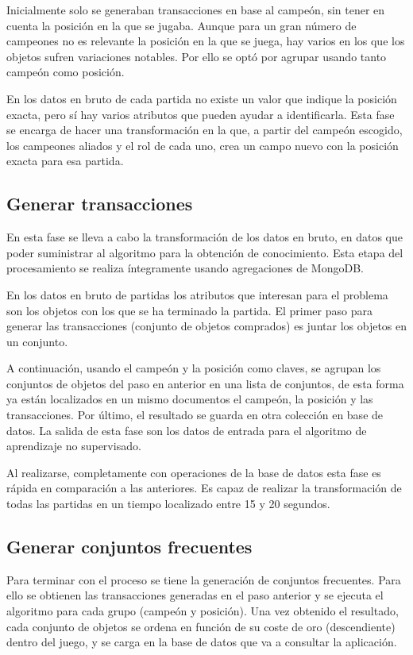 Inicialmente solo se generaban transacciones en base al campeón, sin tener en cuenta la posición en la que se jugaba. Aunque para un gran número de campeones no es relevante la posición en la que se juega, hay varios en los que los objetos sufren variaciones notables. Por ello se optó por agrupar usando tanto campeón como posición.

En los datos en bruto de cada partida no existe un valor que indique la posición exacta, pero sí hay varios atributos que pueden ayudar a identificarla. Esta fase se encarga de hacer una transformación en la que, a partir del campeón escogido, los campeones aliados y el rol de cada uno, crea un campo nuevo con la posición exacta para esa partida.

\subsection{Generar transacciones}
En esta fase se lleva a cabo la transformación de los datos en bruto, en datos que poder suministrar al algoritmo para la obtención de conocimiento. Esta etapa del procesamiento se realiza íntegramente usando agregaciones de MongoDB.

En los datos en bruto de partidas los atributos que interesan para el problema son los objetos con los que se ha terminado la partida. El primer paso para generar las transacciones (conjunto de objetos comprados) es juntar los objetos en un conjunto.

A continuación, usando el campeón y la posición como claves, se agrupan los conjuntos de objetos del paso en anterior en una lista de conjuntos, de esta forma ya están localizados en un mismo documentos el campeón, la posición y las transacciones. Por último, el resultado se guarda en otra colección en base de datos. La salida de esta fase son los datos de entrada para el algoritmo de aprendizaje no supervisado.

Al realizarse, completamente con operaciones de la base de datos esta fase es rápida en comparación a las anteriores. Es capaz de realizar la transformación de todas las partidas en un tiempo localizado entre 15 y 20 segundos.

\subsection{Generar conjuntos frecuentes}
Para terminar con el proceso se tiene la generación de conjuntos frecuentes. Para ello se obtienen las transacciones generadas en el paso anterior y se ejecuta el algoritmo para cada grupo (campeón y posición). Una vez obtenido el resultado, cada conjunto de objetos se ordena en función de su coste de oro (descendiente) dentro del juego, y se carga en la base de datos que va a consultar la aplicación.


